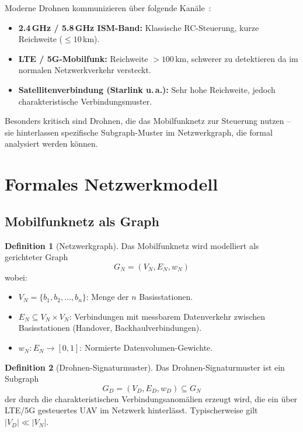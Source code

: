 ﻿\documentclass[a4paper,12pt]{article}
\theoremstyle{definition}
\newtheorem{definition}{Definition}
\begin{document}
Moderne Drohnen kommunizieren \"uber folgende Kan\"ale~\cite{faa2024uas}:

\begin{itemize}
    \item \textbf{2.4\,GHz / 5.8\,GHz ISM-Band:} Klassische RC-Steuerung,
          kurze Reichweite ($\leq 10$\,km).
    \item \textbf{LTE / 5G-Mobilfunk:} Reichweite $> 100$\,km, schwerer
          zu detektieren da im normalen Netzwerkverkehr versteckt.
    \item \textbf{Satellitenverbindung (Starlink u.\,a.):} Sehr hohe Reichweite,
          jedoch charakteristische Verbindungsmuster.
\end{itemize}

Besonders kritisch sind Drohnen, die das Mobilfunknetz zur Steuerung nutzen --
sie hinterlassen spezifische Subgraph-Muster im Netzwerkgraph, die formal
analysiert werden k\"onnen.

\section{Formales Netzwerkmodell}
\label{sec:modell}

\subsection{Mobilfunknetz als Graph}

\begin{definition}[Netzwerkgraph]
\label{def:netzgraph}
    Das Mobilfunknetz wird modelliert als gerichteter Graph
    \[
    G_N = (V_N, E_N, w_N)
    \]
    wobei:
    \begin{itemize}
        \item $V_N = \{b_1, b_2, \ldots, b_n\}$: Menge der $n$ Basisstationen.
        \item $E_N \subseteq V_N \times V_N$: Verbindungen mit messbarem
              Datenverkehr zwischen Basisstationen (Handover, Backhaulverbindungen).
        \item $w_N: E_N \to [0, 1]$: Normierte Datenvolumen-Gewichte.
    \end{itemize}
\end{definition}

\begin{definition}[Drohnen-Signaturmuster]
\label{def:drohnengraph}
    Das Drohnen-Signaturmuster ist ein Subgraph
    \[
    G_D = (V_D, E_D, w_D) \subseteq G_N
    \]
    der durch die charakteristischen Verbindungsanom\"alien erzeugt wird,
    die ein \"uber LTE/5G gesteuertes UAV im Netzwerk hinterl\"asst.
    Typischerweise gilt $|V_D| \ll |V_N|$.
\end{definition}
\end{document}
